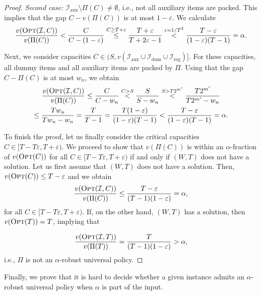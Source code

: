 \documentclass[11pt]{article}
\newcommand{\opt}{\textsc{Opt}}
\newcommand{\OPT}{\opt}
\newcommand{\I}{\mathcal{I}}
\renewcommand{\epsilon}{\varepsilon}
\begin{document}
\begin{proof}
\emph{Second case: $\I_{\text{{aux}}}\setminus\Pi(C)\neq\emptyset$},
i.e., not all auxiliary items are packed. This implies that the gap
$C-v(\Pi(C))$ is at most $1-\epsilon$. We calculate
\[
\frac{v(\OPT(\I,C))}{v(\Pi(C))}<\frac{C}{C-(1-\epsilon)}\overset{C\geq
T+\varepsilon}{\leq}\frac{T+\epsilon}{T+2\epsilon-1}\overset{\varepsilon=1/T^{2}}{<}\frac{T-\epsilon}{(1-\epsilon)(T-1)}
=\alpha.
\]


Next, we consider capacities $C\in(S,v(\I_{\text{{aux}}}\cup\I_{\text{{dum}}}\cup\I_{\text{{reg}}})]$.
For these capacities, all dummy items and all auxiliary items are
packed by $\Pi$. Using that the gap $C-\Pi(C)$ is at most $w_{n}$,
we obtain
\begin{multline*}
\frac{v(\OPT(\I,C))}{v(\Pi(C))}\leq\frac{C}{C-w_{n}}\overset{C>S}{<}\frac{S}{S-w_{n}}\overset{S>T2^{m'}}{<}\frac{T2^{m'}}{
T2^{m'}-w_{n}}\\
\leq\frac{Tw_{n}}{Tw_{n}-w_{n}}=\frac{T}{T-1}=\frac{T(1-\varepsilon)}{(1-\epsilon)(T-1)}<\frac{T-\epsilon}{(1-\epsilon)(T-1)
}=\alpha.
\end{multline*}


To finish the proof, let us finally consider the critical capacities
$C\in\big[T-T\epsilon,T+\epsilon\big)$. We proceed to show that $v(\Pi(C))$
is within an $\alpha$-fraction of $v(\OPT(C))$ for all $C\in\big[T-T\epsilon,T+\epsilon\big)$
if and only if $(W,T)$ does not have a solution. Let us first assume
that $(W,T)$ does not have a solution. Then, $v(\OPT(C))\leq T-\epsilon$
and we obtain
\[
\frac{v(\OPT(\I,C))}{v(\Pi(C))}\leq\frac{T-\epsilon}{(T-1)(1-\epsilon)}=\alpha,
\]
for all $C\in\big[T-T\epsilon,T+\epsilon\big)$. If, on the other
hand, $(W,T)$ has a solution, then $v(\OPT(T))=T$, implying that 

\[
\frac{v(\OPT(\I,T))}{v(\Pi(T))}=\frac{T}{(T-1)(1-\epsilon)}>\alpha,
\]
i.e., $\Pi$ is not an $\alpha$-robust universal policy.
\end{proof}

Finally, we prove that it is hard to decide whether a given instance
admits an $\alpha$-robust universal policy when $\alpha$ is part
of the input.
\end{document}
